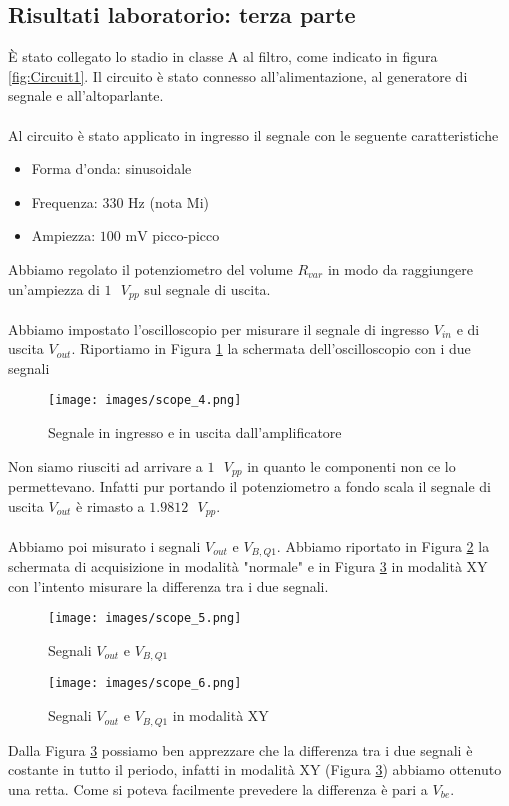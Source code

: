 \subsection{Risultati laboratorio: terza parte}
È stato collegato lo stadio in classe A al filtro, come indicato in figura \ref{fig:Circuit1}. Il circuito è stato connesso all'alimentazione, al generatore di segnale e all'altoparlante.\\\\
Al circuito è stato applicato in ingresso il segnale con le seguente caratteristiche
\begin{itemize}
    \item Forma d'onda: sinusoidale
    \item Frequenza: 330 Hz (nota Mi)
    \item Ampiezza: $100\text{ mV}$ picco-picco
\end{itemize}
Abbiamo regolato il potenziometro del volume $R_{var}$ in modo da raggiungere un'ampiezza di $1\text{ } V_{pp}$ sul segnale di uscita.\\\\
Abbiamo impostato l'oscilloscopio per misurare il segnale di ingresso $V_{in}$ e di uscita $V_{out}$. Riportiamo in Figura \ref{fig:scope_4} la schermata dell'oscilloscopio con i due segnali
\begin{figure}[H]
    \centering
    \texttt{[image: images/scope\_4.png]}
    \caption{Segnale in ingresso e in uscita dall'amplificatore}
    \label{fig:scope_4}
\end{figure}
Non siamo riusciti ad arrivare a $1\text{ } V_{pp}$ in quanto le componenti non ce lo permettevano. Infatti pur portando il potenziometro a fondo scala il segnale di uscita $V_{out}$ è rimasto a $1.9812\text{ } V_{pp}$.\\\\
Abbiamo poi misurato i segnali $V_{out} \text{ e } V_{B,Q1}$. Abbiamo riportato in Figura \ref{fig:scope_5} la schermata di acquisizione in modalità "normale" e in Figura \ref{fig:scope_6} in modalità XY con l'intento misurare la differenza tra i due segnali.
\begin{figure}[H]
    \centering
    \texttt{[image: images/scope\_5.png]}
    \caption{Segnali $V_{out} \text{ e } V_{B,Q1}$}
    \label{fig:scope_5}
\end{figure}
\begin{figure}[H]
    \centering
    \texttt{[image: images/scope\_6.png]}
    \caption{Segnali $V_{out} \text{ e } V_{B,Q1}$ in modalità XY}
    \label{fig:scope_6}
\end{figure}
Dalla Figura \ref{fig:scope_6} possiamo ben apprezzare che la differenza tra i due segnali è costante in tutto il periodo, infatti in modalità XY (Figura \ref{fig:scope_6}) abbiamo ottenuto una retta. Come si poteva facilmente prevedere la differenza è pari a $V_{be}$.
